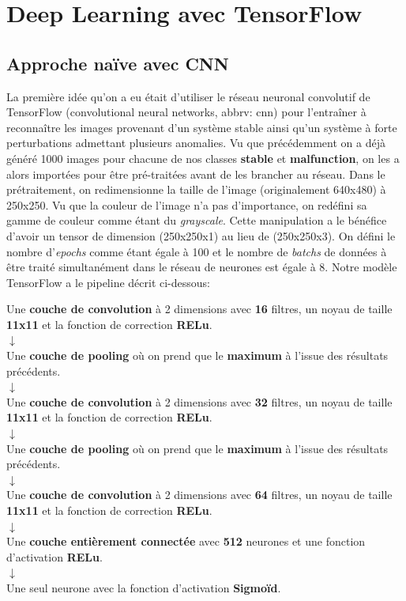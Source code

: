 \documentclass[french]{article}
\theoremstyle{mytheoremstyle}
\theoremstyle{mytheoremstyle}
\theoremstyle{myproblemstyle}
\begin{document}
    \section{Deep Learning avec TensorFlow}
        \subsection{Approche naïve avec CNN}
        La première idée qu'on a eu était d'utiliser le réseau neuronal convolutif de TensorFlow (convolutional neural networks, abbrv: cnn) pour l'entraîner à reconnaître les images provenant d'un système stable ainsi qu'un système à forte perturbations admettant plusieurs anomalies. Vu que précédemment on a déjà généré 1000 images pour chacune de nos classes \textbf{stable} et \textbf{malfunction}, on les a alors importées pour être pré-traitées avant de les brancher au réseau. Dans le prétraitement, on redimensionne la taille de l'image (originalement 640x480) à 250x250. Vu que la couleur de l'image n'a pas d'importance, on redéfini sa gamme de couleur comme étant du \textit{grayscale}. Cette manipulation a le bénéfice d'avoir un tensor de dimension (250x250x1) au lieu de (250x250x3). On défini le nombre d'\textit{epochs} comme étant égale à 100 et le nombre de \textit{batchs} de données à être traité simultanément dans le réseau de neurones est égale à 8. Notre modèle TensorFlow a le pipeline décrit ci-dessous:
        \begin{center}
            Une \textbf{couche de convolution} à 2 dimensions avec \textbf{16} filtres, un noyau de taille \textbf{11x11} et la fonction de correction \textbf{RELu}. \\
            $
            \downarrow
            $\\
            Une \textbf{couche de pooling} où on prend que le \textbf{maximum} à l'issue des résultats précédents. \\
            $
            \downarrow
            $\\
            Une \textbf{couche de convolution} à 2 dimensions avec \textbf{32} filtres, un noyau de taille \textbf{11x11} et la fonction de correction \textbf{RELu}. \\
            $
            \downarrow
            $\\
            Une \textbf{couche de pooling} où on prend que le \textbf{maximum} à l'issue des résultats précédents. \\
            $
            \downarrow
            $\\
            Une \textbf{couche de convolution} à 2 dimensions avec \textbf{64} filtres, un noyau de taille \textbf{11x11} et la fonction de correction \textbf{RELu}.\\
            $
            \downarrow
            $\\
            Une \textbf{couche entièrement connectée} avec \textbf{512} neurones et une fonction d'activation \textbf{RELu}.\\
            $
            \downarrow
            $\\
            Une seul neurone avec la fonction d'activation \textbf{Sigmoïd}.
        \end{center}
\end{document}
